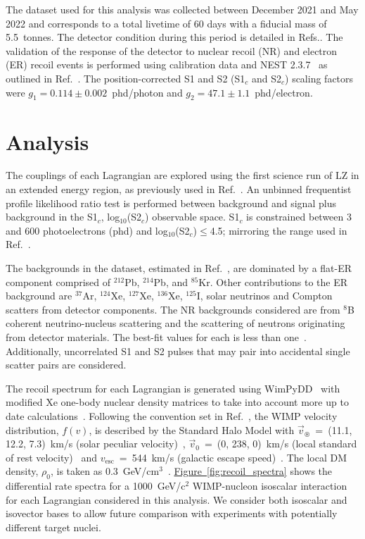 \documentclass[reprint, showpacs,
preprintnumbers,
amsmath,amssymb,
aps, floatfix,
superscriptaddress,
prd, nofootinbib]{revtex4-1}
\begin{document}
The dataset used for this analysis was collected between December 2021 and May 2022 and corresponds to a total livetime of 60 days with a fiducial mass of 5.5~tonnes.
The detector condition during this period is detailed in Refs.\cite{LZ:SR1WS_2022, LZ:SR1_NREFT_2023}.
The validation of the response of the detector to nuclear recoil (NR) and electron (ER) recoil events is performed using calibration data and NEST 2.3.7~\cite{NEST:paper_2022, NEST:paper_2023} as outlined in Ref.~\cite{LZ:SR1_NREFT_2023}.
The position-corrected S1 and S2 (S1$_c$ and S2$_c$) scaling factors were $g_1=0.114\pm0.002$~phd/photon and $g_2=47.1\pm1.1$~phd/electron.

\section{\label{sec:analysis}Analysis}
The couplings of each Lagrangian are explored using the first science run of LZ in an extended energy region, as previously used in Ref.~\cite{LZ:SR1_NREFT_2023}.
An unbinned frequentist profile likelihood ratio test is performed between background and signal plus background in the S1$_c$, log$_{10}$(S2$_c$) observable space. 
S1$_c$ is constrained between 3 and 600 photoelectrons (phd) and log$_{10}$(S2$_c$)$\leq$4.5; mirroring the range used in Ref.~\cite{LZ:SR1_NREFT_2023}.

The backgrounds in the dataset, estimated in Ref.~\cite{LZ:SR1_NREFT_2023}, are dominated by a flat-ER component comprised of ${}^{212}$Pb, ${}^{214}$Pb, and ${}^{85}$Kr.
Other contributions to the ER background are ${}^{37}$Ar, ${}^{124}$Xe, ${}^{127}$Xe, ${}^{136}$Xe, ${}^{125}$I, solar neutrinos and Compton scatters from detector components.
The NR backgrounds considered are from ${}^{8}$B coherent neutrino-nucleus scattering and the scattering of neutrons originating from detector materials.
The best-fit values for each is less than one~\cite{LZ:SR1_NREFT_2023}.
Additionally, uncorrelated S1 and S2 pulses that may pair into accidental single scatter pairs are considered.

The recoil spectrum for each Lagrangian is generated using WimPyDD~\cite{Jeong_2022} with modified Xe one-body nuclear density matrices to take into account more up to date calculations~\cite{MENENDEZ2009139, haxton_unpublished}.
Following the convention set in Ref.~\cite{DM_parameters:BAXTER2021_Conventions}, the WIMP velocity distribution, $f(v)$, is described by the Standard Halo Model with $\vec{v}_\circledast$~=~(11.1, 12.2, 7.3)~km/s (solar peculiar velocity)~\cite{Schoenrich:Local_kinematics}, $\vec{v}_0$~=~(0, 238, 0)~km/s (local standard of rest velocity)~\cite{DM_parameters:galaxy_context_rest_velocity_1, DM_parameters:galaxy_context_rest_velocity_2} and $v_{\text{esc}}$~=~544~km/s (galactic escape speed)~\cite{DM_parameters:RAVE_survey_escape_velocity}. 
The local DM density, $\rho_0$, is taken as 0.3~GeV/cm$^3$~\cite{DM_parameters:LEWIN199687_DM_density}.
\hyperref[fig:recoil_spectra]{Figure~\ref*{fig:recoil_spectra}} shows the differential rate spectra for a 1000~GeV/c$^2$ WIMP-nucleon isoscalar interaction for each Lagrangian considered in this analysis.
We consider both isoscalar and isovector bases to allow future comparison with experiments with potentially different target nuclei.
\end{document}
